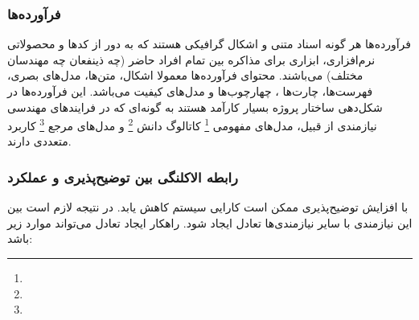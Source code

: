 \subsubsection*{فرآورده‌ها}

فرآورده‌ها هر گونه اسناد متنی و اشکال گرافیکی هستند که به دور از کد‌ها و
محصولاتی نرم‌افزاری، ابزاری برای مذاکره بین تمام افراد‌ حاضر (چه ذینفعان چه
مهندسان مختلف) می‌باشند. محتوای فرآورده‌ها معمولا اشکال، متن‌ها، مدل‌های بصری،
فهرست‌ها، چارت‌ها ، چهارچوب‌ها و مدل‌های کیفیت می‌باشد. این فرآورده‌ها در
شکل‌دهی ساختار پروژه بسیار کارآمد هستند به گونه‌ای که در فرایند‌های مهندسی
نیازمندی از قبیل، مدل‌های مفهومی \footnote{} کاتالوگ دانش
\footnote{} و مدل‌های مرجع \footnote{} کاربرد متعددی دارند.

\subsubsection{رابطه الاکلنگی بین توضیح‌پذیری و عملکرد}

با افزایش توضیح‌پذیری ممکن است کارایی سیستم کاهش یابد. در نتیجه لازم است بین این
نیازمندی با سایر نیازمندی‌ها تعادل ایجاد شود. راهکار ایجاد تعادل می‌تواند موارد
زیر باشد:




